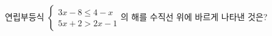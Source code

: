 연립부등식 $\begin{cases} 3x-8\le 4-x \\ 5x+2>2x-1 \end{cases}$의 해를 수직선 위에 바르게 나타낸 것은?
\begin{choicesii}{}{}{}{}{}\end{choicesii}
